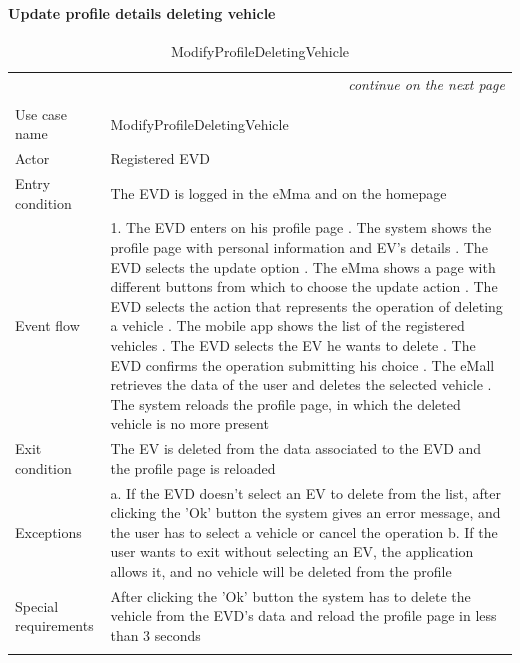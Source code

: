 \paragraph{Update profile details deleting vehicle}
\begin{center}
    \begin{longtable}{p{4cm} p{11cm}}
    \multicolumn{2}{r}{\itshape{continue on the next page}}\\
    \endfoot 
    \\
    \endlastfoot
    \hline
     Use case name &  ModifyProfileDeletingVehicle\\
     \hline
     Actor & Registered EVD \\
     \hline
     Entry condition & The EVD is logged in the eMma and on the homepage \\
     \hline
     Event flow &   1. The EVD enters on his profile page \newline
                    2. The system shows the profile page with personal information and EV's details \newline
                    3. The EVD selects the update option \newline
                    4. The eMma shows a page with different buttons from which to choose the update action \newline
                    5. The EVD selects the action that represents the operation of deleting  a vehicle \newline
                    6. The mobile app shows the list of the registered vehicles \newline
                    7. The EVD selects the EV he wants to delete \newline
                    8. The EVD confirms the operation submitting his choice \newline
                    9. The eMall retrieves the data of the user and deletes the selected vehicle \newline
                    10. The system reloads the profile page, in which the deleted vehicle is no more present \\
     \hline
     Exit condition &  The EV is deleted from the data associated to the EVD and the profile page is reloaded \\
     \hline
     Exceptions &   a. If the EVD doesn't select an EV to delete from the list, after clicking the 'Ok' button the                     system gives an error message, and the user has to select a vehicle or cancel the operation                     \newline
                    b. If the user wants to exit without selecting an EV, the application allows it, and no vehicle will be deleted from the profile\\
     \hline
     Special requirements & After clicking the 'Ok' button the system has to delete the vehicle from the EVD's data and reload the profile page in less than 3 seconds \\
     \hline
    \caption{ModifyProfileDeletingVehicle}
    \label{tab:ModifyProfileDeletingVehicle}
    \end{longtable}
\end{center}

